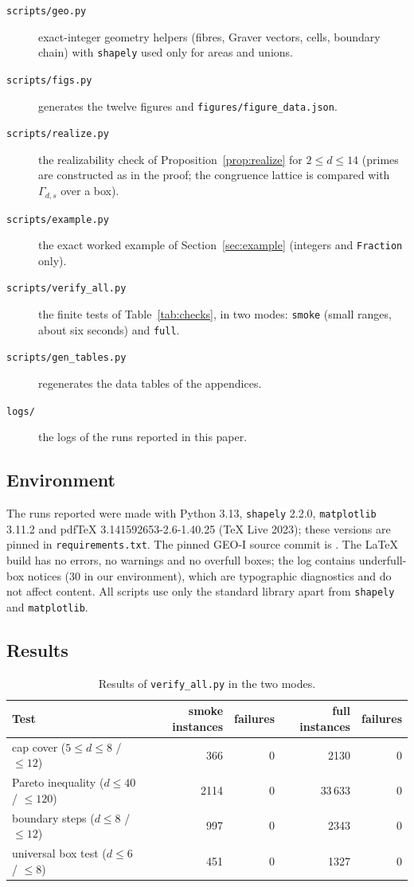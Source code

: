\begin{description}
\item[\texttt{scripts/geo.py}] exact-integer geometry helpers (fibres, Graver vectors, cells, boundary chain) with \texttt{shapely} used only for areas and unions.
\item[\texttt{scripts/figs.py}] generates the twelve figures and \texttt{figures/figure\_data.json}.
\item[\texttt{scripts/realize.py}] the realizability check of Proposition~\ref{prop:realize} for $2\le d\le14$ (primes are constructed as in the proof; the congruence lattice is compared with $\Gamma_{d,s}$ over a box).
\item[\texttt{scripts/example.py}] the exact worked example of Section~\ref{sec:example} (integers and \texttt{Fraction} only).
\item[\texttt{scripts/verify\_all.py}] the finite tests of Table~\ref{tab:checks}, in two modes: \texttt{smoke} (small ranges, about six seconds) and \texttt{full}.
\item[\texttt{scripts/gen\_tables.py}] regenerates the data tables of the appendices.
\item[\texttt{logs/}] the logs of the runs reported in this paper.
\end{description}

\subsection{Environment}

The runs reported were made with Python 3.13, \texttt{shapely} 2.2.0, \texttt{matplotlib} 3.11.2 and pdfTeX 3.141592653-2.6-1.40.25 (TeX Live 2023); these versions are pinned in \texttt{requirements.txt}. The pinned GEO-I source commit is \geoicommit. The \LaTeX{} build has no errors, no warnings and no overfull boxes; the log contains underfull-box notices (30 in our environment), which are typographic diagnostics and do not affect content. All scripts use only the standard library apart from \texttt{shapely} and \texttt{matplotlib}.

\subsection{Results}

\begin{table}[ht]
\centering\small
\begin{tabular}{@{}lrrrr@{}}
\toprule
Test & smoke instances & failures & full instances & failures\\
\midrule
cap cover ($5\le d\le8$ / $\le12$) & 366 & 0 & 2130 & 0\\
Pareto inequality ($d\le40$ / $\le120$) & 2114 & 0 & 33\,633 & 0\\
boundary steps ($d\le8$ / $\le12$) & 997 & 0 & 2343 & 0\\
universal box test ($d\le6$ / $\le8$) & 451 & 0 & 1327 & 0\\
\bottomrule
\end{tabular}
\caption{Results of \texttt{verify\_all.py} in the two modes.}\label{tab:verify-app}
\end{table}

